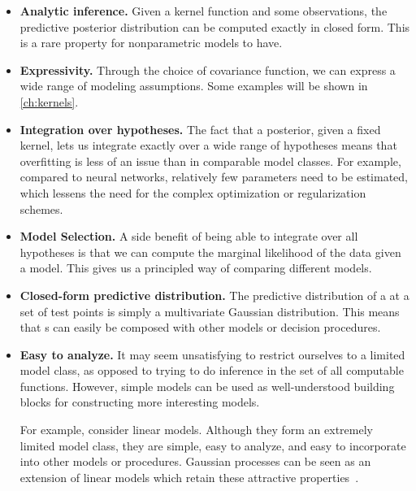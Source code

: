 \begin{itemize}

\item {\bf Analytic inference.}
Given a kernel function and some observations, the predictive posterior distribution can be computed exactly in closed form.
This is a rare property for nonparametric models to have.

\item {\bf Expressivity.}
Through the choice of covariance function, we can express a wide range of modeling assumptions.
Some examples will be shown in \cref{ch:kernels}.

\item {\bf Integration over hypotheses.}
The fact that a \gp{} posterior, given a fixed kernel, lets us integrate exactly over a wide range of hypotheses means that overfitting is less of an issue than in comparable model classes.
For example, compared to neural networks, relatively few parameters need to be estimated, which lessens the need for the complex optimization or regularization schemes.
%

\item {\bf Model Selection.}
A side benefit of being able to integrate over all hypotheses is that we can compute the marginal likelihood of the data given a model.
This gives us a principled way of comparing different models.

\item {\bf Closed-form predictive distribution.}
The predictive distribution of a \gp{} at a set of test points is simply a multivariate Gaussian distribution.
This means that \gp{}s can easily be composed with other models or decision procedures.

\item {\bf Easy to analyze.}
It may seem unsatisfying to restrict ourselves to a limited model class, as opposed to trying to do inference in the set of all computable functions.
However, simple models can be used as well-understood building blocks for constructing more interesting models. %

For example, consider linear models.
Although they form an extremely limited model class, they are simple, easy to analyze, and easy to incorporate into other models or procedures.
Gaussian processes can be seen as an extension of linear models which retain these attractive properties~\citep[chapter 2]{rasmussen38gaussian}.


\end{itemize}




